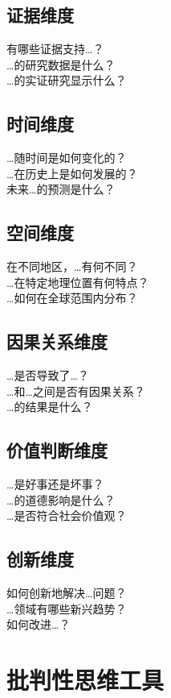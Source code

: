 \documentclass[12pt]{book}
\begin{document}
\subsection{证据维度}
有哪些证据支持…？\\
…的研究数据是什么？\\
…的实证研究显示什么？\\

\subsection{时间维度}
…随时间是如何变化的？\\
…在历史上是如何发展的？\\
未来…的预测是什么？\\

\subsection{空间维度}
在不同地区，…有何不同？\\
…在特定地理位置有何特点？\\
…如何在全球范围内分布？\\

\subsection{因果关系维度}
…是否导致了…？\\
…和…之间是否有因果关系？\\
…的结果是什么？\\

\subsection{价值判断维度}
…是好事还是坏事？\\
…的道德影响是什么？\\
…是否符合社会价值观？\\

\subsection{创新维度}
如何创新地解决…问题？\\
…领域有哪些新兴趋势？\\
如何改进…？\\



\section{批判性思维工具}
\end{document}
